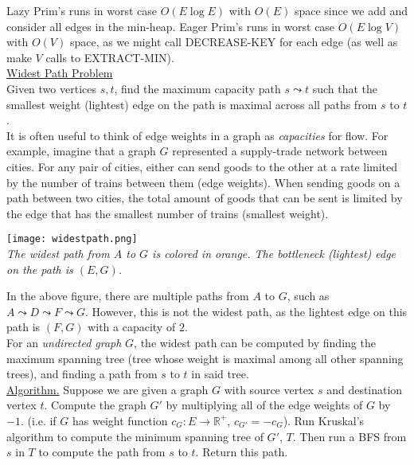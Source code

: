 \documentclass[12pt, fleqn]{general}
\begin{document}
\begin{multicols*}{2}
    Lazy Prim's runs in worst case $O(E \log E)$ with $O(E)$ space since we add and consider all edges in the min-heap. Eager Prim's runs in worst case $O(E\log V)$ with $O(V)$ space, as we might call DECREASE-KEY for each edge (as well as make $V$ calls to EXTRACT-MIN).\\


    {\large \underline{Widest Path Problem}}\\

    Given two vertices $s, t$, find the maximum capacity path $s \leadsto t$ such that the smallest weight (lightest) edge on the path is maximal across all paths from $s$ to $t$.\\

    It is often useful to think of edge weights in a graph as \emph{capacities} for flow. For example, imagine that a graph $G$ represented a supply-trade network between cities. For any pair of cities, either can send goods to the other at a rate limited by the number of trains between them (edge weights). When sending goods on a path between two cities, the total amount of goods that can be sent is limited by the edge that has the smallest number of trains (smallest
    weight).

    \begin{center}
    \texttt{[image: widestpath.png]}\\
    \emph{The widest path from $A$ to $G$ is colored in orange. The bottleneck (lightest) edge on the path is $(E, G)$.}
    \end{center}

    In the above figure, there are multiple paths from $A$ to $G$, such as $A\leadsto D \leadsto F \leadsto G$. However, this is not the widest path, as the lightest edge on this path is $(F, G)$ with a capacity of $2$.\\

    For an \emph{undirected graph} $G$, the widest path can be computed by finding the maximum spanning tree (tree whose weight is maximal among all other spanning trees), and finding a path from $s$ to $t$ in said tree.\\

    \underline{Algorithm.} Suppose we are given a graph $G$ with source vertex $s$ and destination vertex $t$. Compute the graph $G'$ by multiplying all of the edge weights of $G$ by $-1$. (i.e. if $G$ has weight function $c_G : E \rightarrow \mathbb{R^{+}}$, $c_{G'} = - c_{G}$). Run Kruskal's algorithm to compute the minimum spanning tree of $G'$, $T$. Then run a BFS from $s$ in $T$ to compute the path from $s$ to $t$. Return this path.


\end{multicols*}
\end{document}
